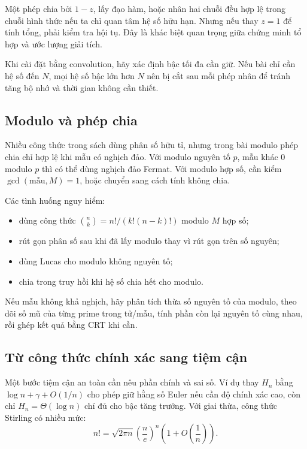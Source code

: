 \documentclass[11pt]{article}
\begin{document}
Một phép chia bởi \(1-z\), lấy đạo hàm, hoặc nhân hai chuỗi đều hợp lệ trong
chuỗi hình thức nếu ta chỉ quan tâm hệ số hữu hạn. Nhưng nếu thay \(z=1\) để
tính tổng, phải kiểm tra hội tụ. Đây là khác biệt quan trọng giữa chứng minh
tổ hợp và ước lượng giải tích.

Khi cài đặt bằng convolution, hãy xác định bậc tối đa cần giữ. Nếu bài chỉ cần
hệ số đến \(N\), mọi hệ số bậc lớn hơn \(N\) nên bị cắt sau mỗi phép nhân để
tránh tăng bộ nhớ và thời gian không cần thiết.

\subsection{Modulo và phép chia}

Nhiều công thức trong sách dùng phân số hữu tỉ, nhưng trong bài modulo phép chia
chỉ hợp lệ khi mẫu có nghịch đảo. Với modulo nguyên tố \(p\), mẫu khác \(0\)
modulo \(p\) thì có thể dùng nghịch đảo Fermat. Với modulo hợp số, cần kiểm
\(\gcd(\text{mẫu},M)=1\), hoặc chuyển sang cách tính không chia.

Các tình huống nguy hiểm:
\begin{itemize}
  \item dùng công thức \(\binom{n}{k}=n!/(k!(n-k)!)\) modulo \(M\) hợp số;
  \item rút gọn phân số sau khi đã lấy modulo thay vì rút gọn trên số nguyên;
  \item dùng Lucas cho modulo không nguyên tố;
  \item chia trong truy hồi khi hệ số chia hết cho modulo.
\end{itemize}

Nếu mẫu không khả nghịch, hãy phân tích thừa số nguyên tố của modulo, theo dõi
số mũ của từng prime trong tử/mẫu, tính phần còn lại nguyên tố cùng nhau, rồi
ghép kết quả bằng CRT khi cần.

\subsection{Từ công thức chính xác sang tiệm cận}

Một bước tiệm cận an toàn cần nêu phần chính và sai số. Ví dụ thay \(H_n\) bằng
\(\log n+\gamma+O(1/n)\) cho phép giữ hằng số Euler nếu cần độ chính xác cao,
còn chỉ \(H_n=\Theta(\log n)\) chỉ đủ cho bậc tăng trưởng. Với giai thừa, công
thức Stirling có nhiều mức:
\[
  n! = \sqrt{2\pi n}\left(\frac{n}{e}\right)^n
       \left(1+O\left(\frac1n\right)\right).
\]
\end{document}

